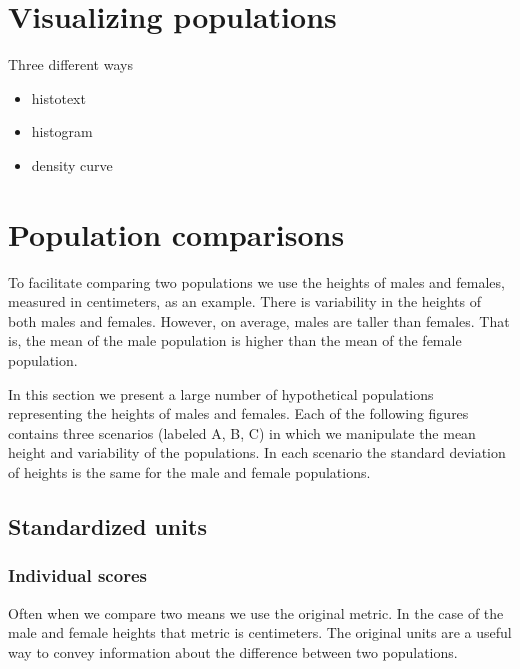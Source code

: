 \documentclass[
]{krantz}
\begin{document}
\hypertarget{visualizing-populations}{%
\section{Visualizing populations}\label{visualizing-populations}}

Three different ways

\begin{itemize}
\item
  histotext
\item
  histogram
\item
  density curve
\end{itemize}

\hypertarget{population-comparisons}{%
\section{Population comparisons}\label{population-comparisons}}

To facilitate comparing two populations we use the heights of males and females, measured in centimeters, as an example. There is variability in the heights of both males and females. However, on average, males are taller than females. That is, the mean of the male population is higher than the mean of the female population.

In this section we present a large number of hypothetical populations representing the heights of males and females. Each of the following figures contains three scenarios (labeled A, B, C) in which we manipulate the mean height and variability of the populations. In each scenario the standard deviation of heights is the same for the male and female populations.

\hypertarget{standardized-units}{%
\subsection{Standardized units}\label{standardized-units}}

\hypertarget{individual-scores}{%
\subsubsection{Individual scores}\label{individual-scores}}

Often when we compare two means we use the original metric. In the case of the male and female heights that metric is centimeters. The original units are a useful way to convey information about the difference between two populations.
\end{document}
